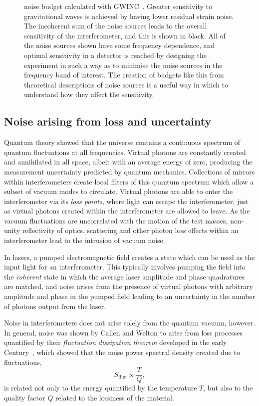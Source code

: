 \begin{figure}
  \centering
  
  \caption[Advanced LIGO noise budget]{\label{fig:aligo-noise-budget}\ALIGO{} noise budget calculated with \gls{GWINC}~\cite{gwinc}. Greater sensitivity to gravitational waves is achieved by having lower residual strain noise. The incoherent sum of the noise sources leads to the overall sensitivity of the interferometer, and this is shown in black. All of the noise sources shown have some frequency dependence, and optimal sensitivity in a detector is reached by designing the experiment in such a way as to minimise the noise sources in the frequency band of interest. The creation of budgets like this from theoretical descriptions of noise sources is a useful way in which to understand how they affect the sensitivity.}
\end{figure}

\subsection{\label{sec:noise-via-loss}Noise arising from loss and uncertainty}
Quantum theory showed that the universe contains a continuous spectrum of quantum fluctuations at all frequencies. Virtual photons are constantly created and annihilated in all space, albeit with an average energy of zero, producing the measurement uncertainty predicted by quantum mechanics. Collections of mirrors within interferometers create local filters of this quantum spectrum which allow a subset of vacuum modes to circulate. Virtual photons are able to enter the interferometer via its \emph{loss points}, where light can escape the interferometer, just as virtual photons created within the interferometer are allowed to leave. As the vacuum fluctuations are uncorrelated with the motion of the test masses, non-unity reflectivity of optics, scattering and other photon loss effects within an interferometer lead to the intrusion of vacuum noise.

In lasers, a pumped electromagnetic field creates a state which can be used as the input light for an interferometer. This typically involves pumping the field into the \emph{coherent} state in which the average laser amplitude and phase quadratures are matched, and noise arises from the presence of virtual photons with arbitrary amplitude and phase in the pumped field leading to an uncertainty in the number of photons output from the laser.

Noise in interferometers does not arise solely from the quantum vacuum, however. In general, noise was shown by Callen and Welton to arise from loss processes quantified by their \emph{fluctuation dissipation theorem} developed in the early  Century~\cite{Callen1951}, which showed that the noise power spectral density created due to fluctuations,
\begin{equation}
  S_{\text{fluc}} \propto \frac{T}{Q},
\end{equation}
is related not only to the energy quantified by the temperature $T$, but also to the quality factor $Q$ related to the lossiness of the material.

